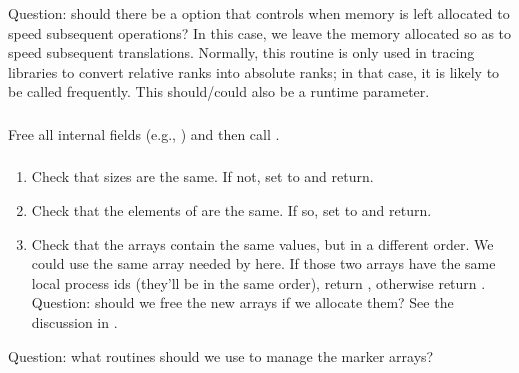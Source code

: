 \documentclass{article}
\begin{document}
Question: should there be a
 option that controls when 
memory is left allocated to speed subsequent operations?  In this case, we
leave the memory allocated so as to speed subsequent translations.  Normally,
this routine is only used in tracing libraries to convert relative ranks into
absolute ranks; in that case, it is likely to be called frequently.
This should/could also be a runtime parameter.

\subsubsection{}
Free all internal fields (e.g., ) and then
call . 

\subsubsection{}
\begin{enumerate}
\item Check that sizes are the same.  If not, set  to
   and return.
\item Check that the elements of  are the same.  If so,
set  to  and return.
\item Check that the  arrays
  contain the same values, but 
  in a different order.  We could use the same array needed by
   here.  If those two arrays have the same
  local process ids (they'll be in the same order), return
  , otherwise return 
  .  
  Question: should we free the new arrays if we allocate them?  See
  the discussion in .
\end{enumerate}

Question: what routines should we use to manage the marker arrays?
\end{document}
